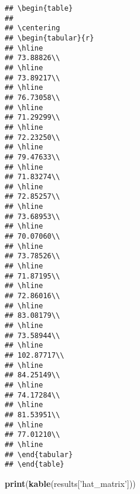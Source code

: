 \documentclass[]{article}
\newenvironment{Shaded}{\begin{snugshade}}{\end{snugshade}}
\newcommand{\KeywordTok}[1]{\textcolor[rgb]{0.13,0.29,0.53}{\textbf{#1}}}
\newcommand{\StringTok}[1]{\textcolor[rgb]{0.31,0.60,0.02}{#1}}
\newcommand{\NormalTok}[1]{#1}
\begin{document}
\begin{verbatim}
## \begin{table}
## 
## \centering
## \begin{tabular}{r}
## \hline
## 73.88826\\
## \hline
## 73.89217\\
## \hline
## 76.73058\\
## \hline
## 71.29299\\
## \hline
## 72.23250\\
## \hline
## 79.47633\\
## \hline
## 71.83274\\
## \hline
## 72.85257\\
## \hline
## 73.68953\\
## \hline
## 70.07060\\
## \hline
## 73.78526\\
## \hline
## 71.87195\\
## \hline
## 72.86016\\
## \hline
## 83.08179\\
## \hline
## 73.58944\\
## \hline
## 102.87717\\
## \hline
## 84.25149\\
## \hline
## 74.17284\\
## \hline
## 81.53951\\
## \hline
## 77.01210\\
## \hline
## \end{tabular}
## \end{table}
\end{verbatim}

\begin{Shaded}
\begin{Highlighting}[]
\KeywordTok{print}\NormalTok{(}\KeywordTok{kable}\NormalTok{(results[}\StringTok{'hat_matrix'}\NormalTok{]))}
\end{Highlighting}
\end{Shaded}
\end{document}
